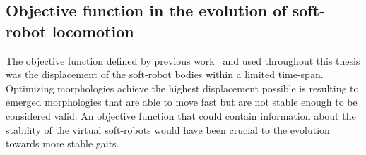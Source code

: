\subsection*{Objective function in the evolution of soft-robot locomotion}

The objective function defined by previous work~\citep{cheney2013unshackling} and used throughout this thesis was the displacement of the soft-robot bodies within a limited time-span. Optimizing morphologies achieve the highest displacement possible is resulting to emerged morphologies that are able to move fast but are not stable enough to be considered valid. An objective function that could contain information about the stability of the virtual soft-robots would have been crucial to the evolution towards more stable gaits.